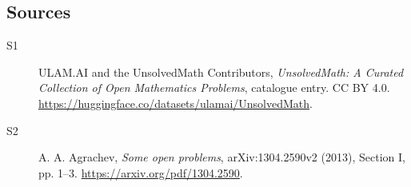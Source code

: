 \documentclass[11pt]{article}
\begin{document}
\subsection{Sources}
\begin{description}
\item[\hypertarget{source:statement:1}{S1}] ULAM.AI and the UnsolvedMath Contributors, \emph{UnsolvedMath: A Curated Collection of Open Mathematics Problems}, catalogue entry. CC BY 4.0. \url{https://huggingface.co/datasets/ulamai/UnsolvedMath}.
\item[\hypertarget{source:statement:2}{S2}] A. A. Agrachev, \emph{Some open problems}, arXiv:1304.2590v2 (2013), Section I, pp. 1--3. \url{https://arxiv.org/pdf/1304.2590}.
\end{description}
\label{end:statement}
\end{document}
